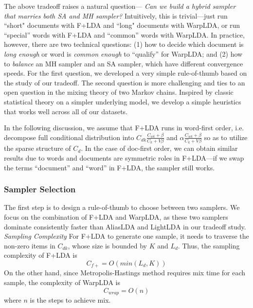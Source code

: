 \documentclass[10pt,journal,cspaper,compsoc]{IEEEtran}
\begin{document}
	The above tradeoff raises a natural question---
	{\em Can we build a hybrid sampler that marries
		both SA and MH sampler?} Intuitively, this
	is trivial---just run ``short" documents
	with F+LDA and ``long" documents with WarpLDA, or
	run ``special'' words with F+LDA and ``common'' words with WarpLDA.
	In practice, however, there are two
	technical questions: (1) how to decide
	which document is {\em long enough} or word is {\em common enough} to
	``qualify'' for WarpLDA; and (2)
	how to {\em balance} an MH sampler and an SA
	sampler, which have different convergence speeds.
	For the first question, we developed a very
	simple rule-of-thumb based on the study
	of our tradeoff. The second question is more
	challenging and ties to an open
	question in the mixing theory of two
	Markov chains. Inspired by classic statistical theory
	on a simpler underlying model, we develop a
	simple heuristics that works well across
	all of our datasets.
	
	In the following discussion, we assume that F+LDA runs in word-first order, i.e. decompose full conditional distribution
	into $C_{dk} \frac{C_{wk} + \beta}{C_k + V\beta}$ and $\alpha \frac{C_{wk} + \beta}{C_k + V\beta}$ so as to utilize the
	sparse structure of $C_{d}$. In the case of doc-first order,
	we can obtain similar results due to words and documents are
	symmetric roles in F+LDA---if we swap the terms ``document''
	and ``word'' in F+LDA, the sampler still works.
	
	\subsubsection{Sampler Selection}
	
	The first step is to design a rule-of-thumb to choose
	between two samplers. We focus on the combination
	of F+LDA and WarpLDA, as these two samplers dominate
	consistently faster than AliasLDA and LightLDA
	in our tradeoff study.
	\\

    \noindent
	{\large \em Sampling Complexity}
	For F+LDA to generate one sample, it needs to traverse
	the non-zero items in $C_{dk}$, whose size is bounded by $K$ and $L_d$.
	Thus, the sampling complexity of F+LDA is
	\begin{displaymath}
	C_{f+} = O(min(L_d, K))
	\end{displaymath}
	On the other hand, since Metropolis-Hastings method requires mix time for each sample,
	the complexity of WarpLDA is
	\begin{displaymath}
	C_{wrap} = O(n)
	\end{displaymath}
	where $n$ is the steps to achieve mix.
	
\end{document}
